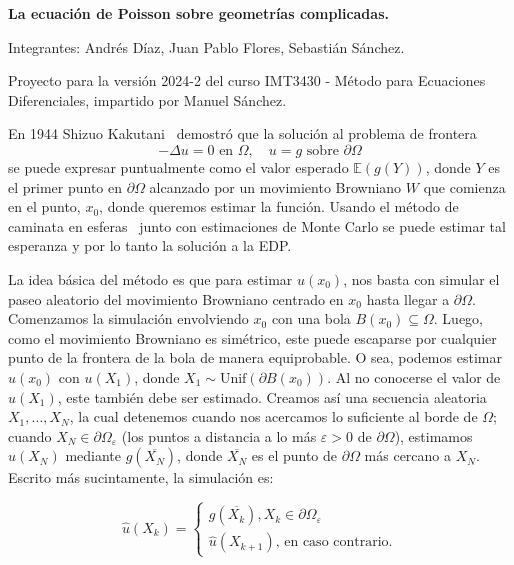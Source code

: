 \documentclass{article}
\begin{document}
\begin{center}
{\bfseries\Large
  La ecuación de Poisson sobre geometrías complicadas.
}

\vspace{0.25cm}

Integrantes: Andrés Díaz, Juan Pablo Flores, Sebastián Sánchez.

\vspace{0.5cm}

{\scriptsize
Proyecto para la versión 2024-2 del curso 
IMT3430 - Método para Ecuaciones Diferenciales, impartido por Manuel Sánchez.
}
\end{center}

En 1944 Shizuo Kakutani~\cite{kak44} demostró que la solución al problema de frontera
\begin{displaymath}
  -\Delta u = 0 \text{ en } \Omega, \quad
  u = g \text{ sobre } \partial\Omega
\end{displaymath}
se puede expresar puntualmente como el valor esperado \(\mathbb{E}(g(Y))\), donde $Y$ es el primer punto en $\partial \Omega$ alcanzado por un movimiento Browniano $W$ que comienza en el punto, $x_0$, donde queremos estimar la función.
Usando el método de caminata en esferas~\cite{sawhney2020} junto con estimaciones de 
Monte Carlo se puede estimar tal esperanza y por lo tanto la solución a la EDP.

La idea básica del método es que para estimar $u(x_0)$, nos basta con simular el paseo aleatorio del movimiento Browniano centrado en $x_0$ hasta llegar a $\partial \Omega$. Comenzamos la simulación envolviendo $x_0$ con una bola $B(x_0)\subseteq\Omega$. Luego, como el movimiento Browniano es simétrico, este puede escaparse por cualquier punto de la frontera de la bola de manera equiprobable. O sea, podemos estimar $u(x_0)$ con $u(X_1)$, donde $X_1\sim \mbox{Unif}(\partial B(x_0))$. Al no conocerse el valor de $u(X_1)$, este también debe ser estimado. Creamos así una secuencia aleatoria $X_1,\ldots,X_{N}$, la cual detenemos cuando nos acercamos lo suficiente al borde de $\Omega$; cuando $X_{N}\in \partial \Omega_\varepsilon$ (los puntos a distancia a lo más $\varepsilon >0$ de $\partial \Omega$), estimamos $u(X_N)$ mediante $g(\overline{X_N})$, donde $\overline{X_N}$ es el punto de $\partial \Omega$ más cercano a $X_N$. Escrito más sucintamente, la simulación es:

\begin{equation*}
    \hat{u}(X_k)=\begin{cases}
        g(\overline{X_k}), X_k\in\partial\Omega_{\varepsilon}\\
        \hat{u}(X_{k+1}),\,\text{en caso contrario.}
    \end{cases}
\end{equation*}
\end{document}
